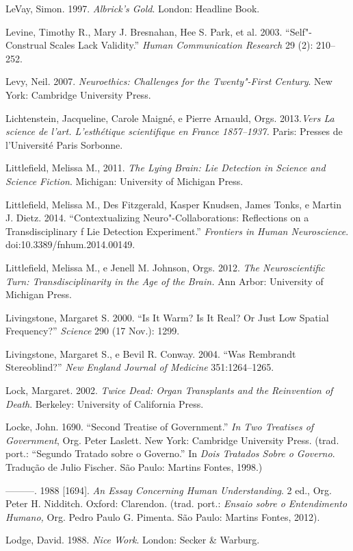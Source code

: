 LeVay, Simon. 1997. \emph{Albrick's Gold}. London: Headline Book.

Levine, Timothy R., Mary J. Bresnahan, Hee S. Park, et al. 2003.
``Self"-Construal Scales Lack Validity.'' \emph{Human Communication
Research} 29 (2): 210--252.

Levy, Neil. 2007. \emph{Neuroethics: Challenges for the Twenty"-First
Century}. New York: Cambridge University Press.

Lichtenstein, Jacqueline, Carole Maigné, e Pierre Arnauld, Orgs.
2013.\emph{Vers La science de l'art. L'esthétique scientifique en France
1857--1937.} Paris: Presses de l'Université Paris Sorbonne.

Littlefield, Melissa M., 2011. \emph{The Lying Brain: Lie Detection in
Science and Science Fiction}. Michigan: University of Michigan Press.

Littlefield, Melissa M., Des Fitzgerald, Kasper Knudsen, James Tonks, e
Martin J. Dietz. 2014. ``Contextualizing Neuro"-Collaborations:
Reflections on a Transdisciplinary f Lie Detection Experiment.''
\emph{Frontiers in Human Neuroscience}. doi:10.3389/fnhum.2014.00149.

Littlefield, Melissa M., e Jenell M. Johnson, Orgs. 2012. \emph{The
Neuroscientific Turn: Transdisciplinarity in the Age of the Brain.} Ann
Arbor: University of Michigan Press.

Livingstone, Margaret S. 2000. ``Is It Warm? Is It Real? Or Just Low
Spatial Frequency?'' \emph{Science} 290 (17 Nov.): 1299.

Livingstone, Margaret S., e Bevil R. Conway. 2004. ``Was Rembrandt
Stereoblind?'' \emph{New England Journal of Medicine} 351:1264--1265.

Lock, Margaret. 2002. \emph{Twice Dead: Organ Transplants and the
Reinvention of Death}. Berkeley: University of California Press.

Locke, John. 1690. ``Second Treatise of Government.'' \emph{In Two
Treatises of Government}, Org. Peter Laslett. New York: Cambridge
University Press. (trad. port.: ``Segundo Tratado sobre o Governo.'' In
\emph{Dois Tratados Sobre o Governo}. Tradução de Julio Fischer. São
Paulo: Martins Fontes, 1998.)

---------. 1988 {[}1694{]}. \emph{An Essay Concerning Human
Understanding}. 2 ed., Org. Peter H. Nidditch. Oxford: Clarendon. (trad.
port.: \emph{Ensaio sobre o Entendimento Humano,} Org. Pedro Paulo G.
Pimenta. São Paulo: Martins Fontes, 2012).

Lodge, David. 1988. \emph{Nice Work}. London: Secker \& Warburg.

